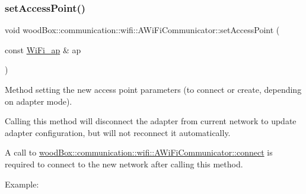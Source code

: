 \subsubsection{\texorpdfstring{set\+Access\+Point()}{setAccessPoint()}}
{\footnotesize\ttfamily void wood\+Box\+::communication\+::wifi\+::\+A\+Wi\+Fi\+Communicator\+::set\+Access\+Point (\begin{DoxyParamCaption}\item[{const \mbox{\hyperlink{structwood_box_1_1communication_1_1wifi_1_1s__wifi__access__point}{Wi\+Fi\+\_\+ap}} \&}]{ap }\end{DoxyParamCaption})}

Method setting the new access point parameters (to connect or create, depending on adapter mode).

Calling this method will disconnect the adapter from current network to update adapter configuration, but will not reconnect it automatically.

A call to \mbox{\hyperlink{classwood_box_1_1communication_1_1wifi_1_1_a_wi_fi_communicator_a7c4763c1594a4b934e5a39e90b271799}{wood\+Box\+::communication\+::wifi\+::\+A\+Wi\+Fi\+Communicator\+::connect}} is required to connect to the new network after calling this method.

Example\+:


